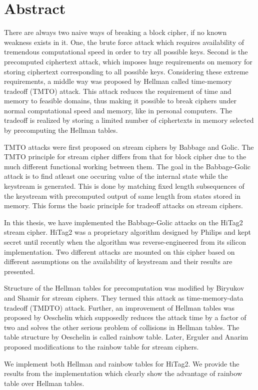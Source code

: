 

\chapter*{Abstract}

There are always two naive ways of breaking a block cipher, if no known weakness exists in it. One, the brute force attack which requires availability of tremendous computational speed in order to try all possible keys. Second is the precomputed ciphertext attack, which imposes huge requirements on memory for storing ciphertext corresponding to all possible keys. Considering these extreme requirements, a middle way was proposed by Hellman called time-memory tradeoff (TMTO) attack. This attack reduces the requirement of time and memory to feasible domains, thus making it possible to break ciphers under normal computational speed and memory, like in personal computers. The tradeoff is realized by storing a limited number of ciphertexts in memory selected by precomputing the Hellman tables.

TMTO attacks were first proposed on stream ciphers by Babbage and Golic. The TMTO principle for stream cipher differs from that for block cipher due to the much different functional working between them. The goal in the Babbage-Golic attack is to find atleast one occuring value of the internal state while the keystream is generated. This is done by matching fixed length subsequences of the keystream with precomputed output of same length from states stored in memory. This forms the basic principle for tradeoff attacks on stream ciphers. 

In this thesis, we have implemented the Babbage-Golic attacks on the HiTag2 stream cipher. HiTag2 was a proprietary algorithm designed by Philips and kept secret until recently when the algorithm was reverse-engineered from its silicon implementation. Two different attacks are mounted on this cipher based on different assumptions on the availability of keystream and their results are presented. 

Structure of the Hellman tables for precomputation was modified by Biryukov and Shamir for stream ciphers. They termed this attack as time-memory-data tradeoff (TMDTO) attack. Further, an improvement of Hellman tables was proposed by Oeschelin which supposedly reduces the attack time by a factor of two and solves the other serious problem of collisions in Hellman tables. The table structure by Oeschelin is called rainbow table. Later, Erguler and Anarim proposed modifications to the rainbow table for stream ciphers.

We implement both Hellman and rainbow tables for HiTag2. We provide the results from the implementation which clearly show the advantage of rainbow table over Hellman tables. 
